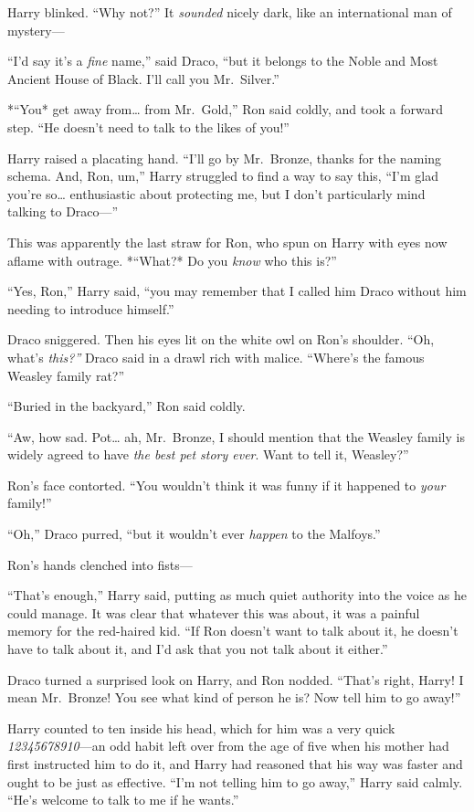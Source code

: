 Harry blinked. ``Why not?'' It \emph{sounded} nicely dark, like an
international man of mystery---

``I'd say it's a \emph{fine} name,'' said Draco, ``but it belongs to the
Noble and Most Ancient House of Black. I'll call you Mr.~Silver.''

*``You* get away from\ldots{} from Mr.~Gold,'' Ron said coldly, and took
a forward step. ``He doesn't need to talk to the likes of you!''

Harry raised a placating hand. ``I'll go by Mr.~Bronze, thanks for the
naming schema. And, Ron, um,'' Harry struggled to find a way to say
this, ``I'm glad you're so\ldots{} enthusiastic about protecting me, but
I don't particularly mind talking to Draco---''

This was apparently the last straw for Ron, who spun on Harry with eyes
now aflame with outrage. *``What?* Do you \emph{know} who this is?''

``Yes, Ron,'' Harry said, ``you may remember that I called him Draco
without him needing to introduce himself.''

Draco sniggered. Then his eyes lit on the white owl on Ron's shoulder.
``Oh, what's \emph{this?''} Draco said in a drawl rich with malice.
``Where's the famous Weasley family rat?''

``Buried in the backyard,'' Ron said coldly.

``Aw, how sad. Pot\ldots{} ah, Mr.~Bronze, I should mention that the
Weasley family is widely agreed to have \emph{the best pet story ever}.
Want to tell it, Weasley?''

Ron's face contorted. ``You wouldn't think it was funny if it happened
to \emph{your} family!''

``Oh,'' Draco purred, ``but it wouldn't ever \emph{happen} to the
Malfoys.''

Ron's hands clenched into fists---

``That's enough,'' Harry said, putting as much quiet authority into the
voice as he could manage. It was clear that whatever this was about, it
was a painful memory for the red-haired kid. ``If Ron doesn't want to
talk about it, he doesn't have to talk about it, and I'd ask that you
not talk about it either.''

Draco turned a surprised look on Harry, and Ron nodded. ``That's right,
Harry! I mean Mr.~Bronze! You see what kind of person he is? Now tell
him to go away!''

Harry counted to ten inside his head, which for him was a very quick
\emph{12345678910}---an odd habit left over from the age of five when
his mother had first instructed him to do it, and Harry had reasoned
that his way was faster and ought to be just as effective. ``I'm not
telling him to go away,'' Harry said calmly. ``He's welcome to talk to
me if he wants.''

